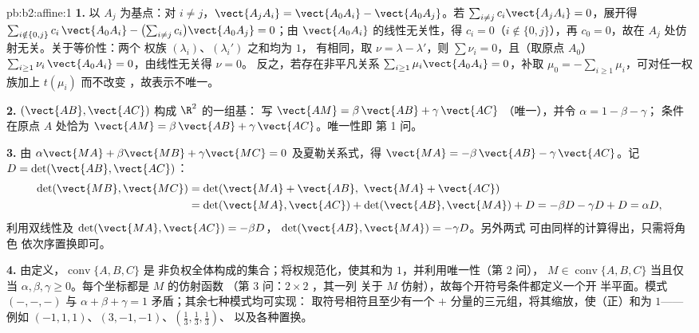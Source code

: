 \begin{solution}{pb:b2:affine:1}
\textbf{1.} 以 $A_j$ 为基点：对 $i \neq j$，$\vect{A_jA_i} =
\vect{A_0A_i} - \vect{A_0A_j}$。若 $\sum_{i \neq j}
c_i\vect{A_jA_i} = 0$，展开得 $\sum_{i \notin \{0,
j\}} c_i\,\vect{A_0A_i} - \bigl(\sum_{i\neq j}
c_i\bigr)\vect{A_0A_j} = 0$；由
$\vect{A_0A_i}$ 的线性无关性，得 $c_i = 0$（$i \notin \{0, j\}$），再
$c_0 = 0$，故在 $A_j$ 处仿射无关。关于等价性：两个
权族 $(\lambda_i)$、$(\lambda_i')$ 之和均为 $1$，
有相同，取 $\nu = \lambda -
\lambda'$，则 $\sum\nu_i = 0$，且（取原点 $A_0$）$\sum_{i \geq
1}\nu_i\,\vect{A_0A_i} = 0$，由线性无关得 $\nu = 0$。
反之，若存在非平凡关系 $\sum_{i\geq1}\mu_i
\vect{A_0A_i} = 0$，补取 $\mu_0 = -\sum_{i\geq1}
\mu_i$，可对任一权族加上 $t(\mu_i)$ 而不改变
，故表示不唯一。

\textbf{2.} $(\vect{AB}, \vect{AC})$ 构成 $\R^2$ 的一组基：
写 $\vect{AM} = \beta\,\vect{AB} + \gamma\,\vect{AC}$
（唯一），并令 $\alpha = 1 - \beta - \gamma$；
条件在原点 $A$ 处恰为 $\vect{AM} =
\beta\,\vect{AB} + \gamma\,\vect{AC}$。唯一性即
第 1 问。

\textbf{3.} 由 $\alpha\vect{MA} + \beta\vect{MB} +
\gamma\vect{MC} = 0$ 及夏勒关系式，得 $\vect{MA} =
-\beta\,\vect{AB} - \gamma\,\vect{AC}$。记 $D =
\det(\vect{AB}, \vect{AC})$：
\begin{align*}
\det(\vect{MB}, \vect{MC})
&= \det(\vect{MA} + \vect{AB},\ \vect{MA} + \vect{AC})\\
&= \det(\vect{MA}, \vect{AC}) + \det(\vect{AB}, \vect{MA}) +
D = -\beta D - \gamma D + D = \alpha D,
\end{align*}
利用双线性及 $\det(\vect{MA}, \vect{AC}) = -\beta D$，
$\det(\vect{AB}, \vect{MA}) = -\gamma D$。另外两式
可由同样的计算得出，只需将角色
依次序置换即可。

\textbf{4.} 由定义，$\operatorname{conv}\{A, B, C\}$ 是
非负权全体构成的集合；将权规范化，使其和为
$1$，并利用唯一性（第 2 问），
$M \in \operatorname{conv}\{A,B,C\}$ 当且仅当 $\alpha, \beta,
\gamma \geq 0$。每个坐标都是 $M$ 的仿射函数
（第 3 问：$2\times2$ ，其一列
关于 $M$ 仿射），故每个开符号条件都定义一个开
半平面。模式 $(-,-,-)$ 与 $\alpha + \beta
+ \gamma = 1$ 矛盾；其余七种模式均可实现：
取符号相符且至少有一个
$+$ 分量的三元组，将其缩放，使（正）和为 $1$——例如
$(-1, 1, 1)$、$(3, -1, -1)$、$(\frac13, \frac13, \frac13)$、
以及各种置换。


\end{solution}
